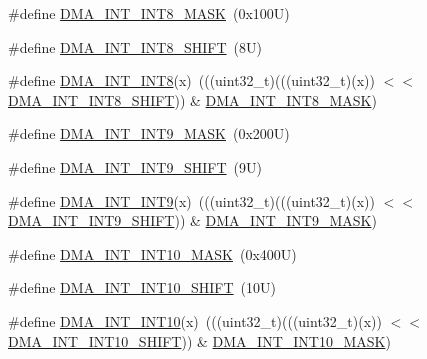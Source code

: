 \begin{DoxyCompactItemize}
\#define \mbox{\hyperlink{group___d_m_a___register___masks_ga5a45f6f8e317c84b71b2b84e08e75590}{D\+M\+A\+\_\+\+I\+N\+T\+\_\+\+I\+N\+T8\+\_\+\+M\+A\+SK}}~(0x100\+U)
\item 
\#define \mbox{\hyperlink{group___d_m_a___register___masks_ga86e6832eae10d9f3466e5ebeb58faaaa}{D\+M\+A\+\_\+\+I\+N\+T\+\_\+\+I\+N\+T8\+\_\+\+S\+H\+I\+FT}}~(8\+U)
\item 
\#define \mbox{\hyperlink{group___d_m_a___register___masks_gaef932d6db06715386ec85ae67206e907}{D\+M\+A\+\_\+\+I\+N\+T\+\_\+\+I\+N\+T8}}(x)~(((uint32\+\_\+t)(((uint32\+\_\+t)(x)) $<$$<$ \mbox{\hyperlink{group___d_m_a___register___masks_ga86e6832eae10d9f3466e5ebeb58faaaa}{D\+M\+A\+\_\+\+I\+N\+T\+\_\+\+I\+N\+T8\+\_\+\+S\+H\+I\+FT}})) \& \mbox{\hyperlink{group___d_m_a___register___masks_ga5a45f6f8e317c84b71b2b84e08e75590}{D\+M\+A\+\_\+\+I\+N\+T\+\_\+\+I\+N\+T8\+\_\+\+M\+A\+SK}})
\item 
\#define \mbox{\hyperlink{group___d_m_a___register___masks_ga04419b2d9cec9aa7487a9454d9fe828a}{D\+M\+A\+\_\+\+I\+N\+T\+\_\+\+I\+N\+T9\+\_\+\+M\+A\+SK}}~(0x200\+U)
\item 
\#define \mbox{\hyperlink{group___d_m_a___register___masks_gaa00bba5d7e4d97f01920216f87d2a788}{D\+M\+A\+\_\+\+I\+N\+T\+\_\+\+I\+N\+T9\+\_\+\+S\+H\+I\+FT}}~(9\+U)
\item 
\#define \mbox{\hyperlink{group___d_m_a___register___masks_ga38172fd78ac4f0262304e9d0803c7bd4}{D\+M\+A\+\_\+\+I\+N\+T\+\_\+\+I\+N\+T9}}(x)~(((uint32\+\_\+t)(((uint32\+\_\+t)(x)) $<$$<$ \mbox{\hyperlink{group___d_m_a___register___masks_gaa00bba5d7e4d97f01920216f87d2a788}{D\+M\+A\+\_\+\+I\+N\+T\+\_\+\+I\+N\+T9\+\_\+\+S\+H\+I\+FT}})) \& \mbox{\hyperlink{group___d_m_a___register___masks_ga04419b2d9cec9aa7487a9454d9fe828a}{D\+M\+A\+\_\+\+I\+N\+T\+\_\+\+I\+N\+T9\+\_\+\+M\+A\+SK}})
\item 
\#define \mbox{\hyperlink{group___d_m_a___register___masks_gabce1884c422b6ac489666e9cf6ae23ed}{D\+M\+A\+\_\+\+I\+N\+T\+\_\+\+I\+N\+T10\+\_\+\+M\+A\+SK}}~(0x400\+U)
\item 
\#define \mbox{\hyperlink{group___d_m_a___register___masks_ga434a37191c71ceb216fb9a641dbbba15}{D\+M\+A\+\_\+\+I\+N\+T\+\_\+\+I\+N\+T10\+\_\+\+S\+H\+I\+FT}}~(10\+U)
\item 
\#define \mbox{\hyperlink{group___d_m_a___register___masks_gae6329119f96f31d38163eba42b9cab92}{D\+M\+A\+\_\+\+I\+N\+T\+\_\+\+I\+N\+T10}}(x)~(((uint32\+\_\+t)(((uint32\+\_\+t)(x)) $<$$<$ \mbox{\hyperlink{group___d_m_a___register___masks_ga434a37191c71ceb216fb9a641dbbba15}{D\+M\+A\+\_\+\+I\+N\+T\+\_\+\+I\+N\+T10\+\_\+\+S\+H\+I\+FT}})) \& \mbox{\hyperlink{group___d_m_a___register___masks_gabce1884c422b6ac489666e9cf6ae23ed}{D\+M\+A\+\_\+\+I\+N\+T\+\_\+\+I\+N\+T10\+\_\+\+M\+A\+SK}})
$$
\end{DoxyCompactItemize}
